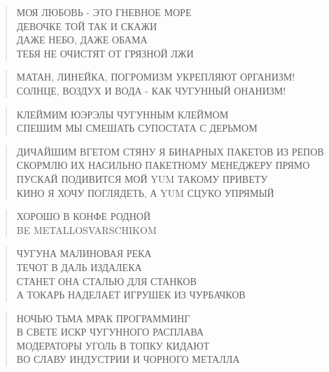 \poemtitle{***}
\begin{verse}
МОЯ ЛЮБОВЬ - ЭТО ГНЕВНОЕ МОРЕ\\
ДЕВОЧКЕ ТОЙ ТАК И СКАЖИ\\
ДАЖЕ НЕБО, ДАЖЕ ОБАМА\\
ТЕБЯ НЕ ОЧИСТЯТ ОТ ГРЯЗНОЙ ЛЖИ
\end{verse}

\poemtitle{***}
\begin{verse}
МАТАН, ЛИНЕЙКА, ПОГРОМИЗМ УКРЕПЛЯЮТ ОРГАНИЗМ!\\
СОЛНЦЕ, ВОЗДУХ И ВОДА - КАК ЧУГУННЫЙ ОНАНИЗМ!
\end{verse}

\poemtitle{***}
\begin{verse}
КЛЕЙМИМ ЮЭРЭЛЫ ЧУГУННЫМ КЛЕЙМОМ\\
СПЕШИМ МЫ СМЕШАТЬ СУПОСТАТА С ДЕРЬМОМ
\end{verse}

\poemtitle{***}
\begin{verse}
ДИЧАЙШИМ ВГЕТОМ СТЯНУ Я БИНАРНЫХ ПАКЕТОВ ИЗ РЕПОВ\\
СКОРМЛЮ ИХ НАСИЛЬНО ПАКЕТНОМУ МЕНЕДЖЕРУ ПРЯМО\\
ПУСКАЙ ПОДИВИТСЯ МОЙ YUM ТАКОМУ ПРИВЕТУ\\
КИНО Я ХОЧУ ПОГЛЯДЕТЬ, А YUM СЦУКО УПРЯМЫЙ
\end{verse}

\poemtitle{***}
\begin{verse}
ХОРОШО В КОНФЕ РОДНОЙ\\
BE METALLOSVARSCHIKOM
\end{verse}

\poemtitle{***}
\begin{verse}
ЧУГУНА МАЛИНОВАЯ РЕКА\\
ТЕЧОТ В ДАЛЬ ИЗДАЛЕКА\\
СТАНЕТ ОНА СТАЛЬЮ ДЛЯ СТАНКОВ\\
А ТОКАРЬ НАДЕЛАЕТ ИГРУШЕК ИЗ ЧУРБАЧКОВ
\end{verse}

\poemtitle{***}
\begin{verse}
НОЧЬЮ ТЬМА МРАК ПРОГРАММИНГ\\
В СВЕТЕ ИСКР ЧУГУННОГО РАСПЛАВА\\
МОДЕРАТОРЫ УГОЛЬ В ТОПКУ КИДАЮТ\\
ВО СЛАВУ ИНДУСТРИИ И ЧОРНОГО МЕТАЛЛА
\end{verse}

